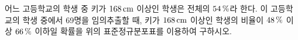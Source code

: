 \noindent\begin{minipage}[t]{0.58\linewidth}\vspace{0pt}\raggedright 어느 고등학교의 학생 중 키가 $168\mkern3mu \mathrm{cm}$ 이상인 학생은 전체의 $54\mkern3mu \%$라 한다. 이 고등학교의 학생 중에서 69명을 임의추출할 때, 키가 $168\mkern3mu \mathrm{cm}$ 이상인 학생의 비율이 $48\mkern3mu \%$ 이상 $66\mkern3mu \%$ 이하일 확률을 위의 표준정규분포표를 이용하여 구하시오.\end{minipage}\hfill\begin{minipage}[t]{0.4\linewidth}\vspace{0pt}\centering \resizebox{\ifdim\width>\linewidth\linewidth\else\width\fi}{!}{}\end{minipage}\par
